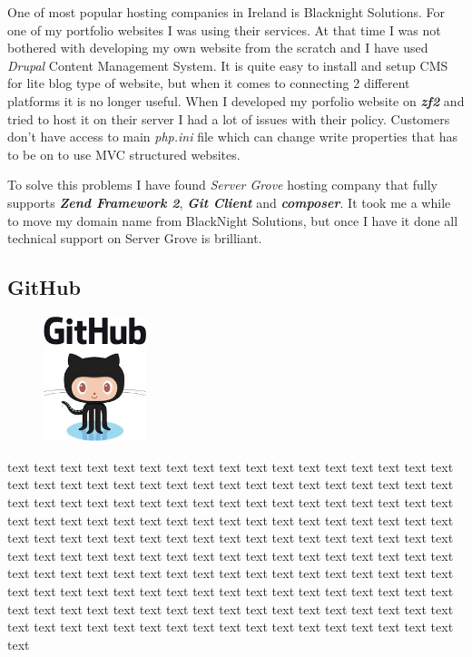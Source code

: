 One of most popular hosting companies in Ireland is Blacknight Solutions. For one of my portfolio websites I was using their services. At that time I was not bothered with developing my own website from the scratch and I have used \textit{Drupal} Content Management System. It is quite easy to install and setup CMS for lite blog type of website, but when it comes to connecting 2 different platforms it is no longer useful. When I developed my porfolio website on \textbf{\textit{zf2}} and tried to host it on their server I had a lot of issues with their policy. Customers don't have access to main \textit{php.ini} file which can change write properties that has to be on to use MVC structured websites. 

To solve this problems I have found \textit{Server Grove} hosting company that fully supports \textbf{\textit{Zend Framework 2}}, \textbf{\textit{Git Client}} and  \textbf{\textit{composer}}. It took me a while to move my domain name from BlackNight Solutions, but once I have it done all technical support on Server Grove is brilliant.



\subsection{GitHub}

\begin{figure}
	\includegraphics[width=3cm]{img/zf2/github-logo.png}
\end{figure} 
text text text text text text text text text text text text text text text text text text text text text text text text text text text text text text text text text text text text text text text text text text text text text text text text text text text text text text text text text text text text text text text text text text text text text text text text text text text text text text text text text text text text text text text text text text text text text text text text text text text text text text text text text text text text text text text text text text text text text text text text text text text text text text text text text text text text text text text text text text text text text text text text text text text text text text text text text text text text text text text text text text text text text text text text text text text 


